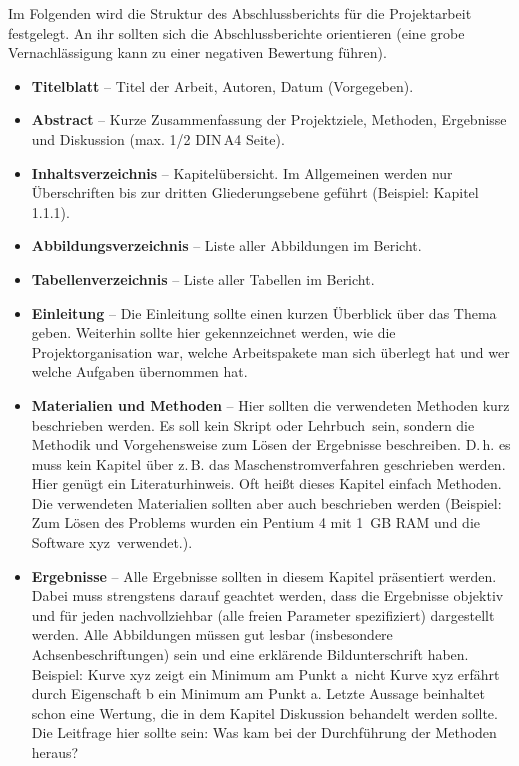 Im Folgenden wird die Struktur des Abschlussberichts für die Projektarbeit festgelegt.
An ihr sollten sich die Abschlussberichte orientieren (eine grobe Vernachlässigung kann
zu einer negativen Bewertung führen).
\begin{itemize}
\item \textbf{Titelblatt} -- Titel der Arbeit, Autoren, Datum (Vorgegeben).
\item \textbf{Abstract} -- Kurze Zusammenfassung der Projektziele, Methoden, Ergebnisse und Diskussion (max. 1/2 DIN\,A4 Seite).
\item \textbf{Inhaltsverzeichnis} -- Kapitelübersicht. Im Allgemeinen werden nur Überschriften bis zur dritten Gliederungsebene geführt (Beispiel: Kapitel 1.1.1).
\item \textbf{Abbildungsverzeichnis} -- Liste aller Abbildungen im Bericht.
\item \textbf{Tabellenverzeichnis} -- Liste aller Tabellen im Bericht.
\item \textbf{Einleitung} -- Die Einleitung sollte einen kurzen Überblick über das Thema geben. Weiterhin sollte hier gekennzeichnet werden, wie die Projektorganisation war, welche Arbeitspakete man sich überlegt hat und wer welche Aufgaben übernommen hat.
\item \textbf{Materialien und Methoden} -- Hier sollten die verwendeten Methoden kurz beschrieben werden. Es soll kein Skript oder \glqq Lehrbuch\grqq\ sein, sondern die Methodik und Vorgehensweise zum Lösen der Ergebnisse beschreiben. D.\,h. es muss kein Kapitel über z.\,B. das Maschenstromverfahren geschrieben werden. Hier genügt ein Literaturhinweis. Oft heißt dieses Kapitel einfach \glqq Methoden\grqq. Die verwendeten Materialien sollten aber auch beschrieben werden (Beispiel: \glqq Zum Lösen des Problems wurden ein Pentium 4 mit \SI{1}{\giga B} RAM und die Software \glqq xyz\grqq\ verwendet.\grqq).
\item \textbf{Ergebnisse} -- Alle Ergebnisse sollten in diesem Kapitel präsentiert werden. Dabei muss strengstens darauf geachtet werden, dass die Ergebnisse objektiv und für jeden nachvollziehbar (alle freien Parameter spezifiziert) dargestellt werden. Alle Abbildungen müssen gut lesbar (insbesondere Achsenbeschriftungen) sein und eine erklärende Bildunterschrift haben. Beispiel: \glqq Kurve xyz zeigt ein Minimum am Punkt a\grqq\ nicht \glqq Kurve xyz erfährt durch Eigenschaft b ein Minimum am Punkt a\grqq. Letzte Aussage beinhaltet schon eine Wertung, die in dem Kapitel Diskussion behandelt werden sollte. Die Leitfrage hier sollte sein: \glqq Was kam bei der Durchführung der Methoden heraus?\grqq

\end{itemize}
